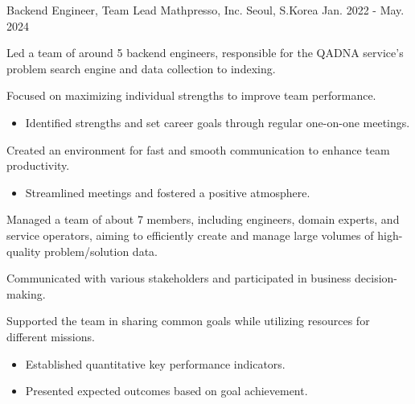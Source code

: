 \begin{cventries}
\cventry
  {Backend Engineer, Team Lead} %
  {Mathpresso, Inc.} %
  {Seoul, S.Korea} %
  {Jan. 2022 - May. 2024} %
  {
    \begin{cvsubentries}
      \begin{cvitems}
        \item[] {Led a team of around 5 backend engineers, responsible for the QADNA service's problem search engine and data collection to indexing.}
        \item {Focused on maximizing individual strengths to improve team performance.}
        \begin{itemize}
          \item {Identified strengths and set career goals through regular one-on-one meetings.}
        \end{itemize}
        \item {Created an environment for fast and smooth communication to enhance team productivity.}
        \begin{itemize}
          \item {Streamlined meetings and fostered a positive atmosphere.}
        \end{itemize}
        \item[]
      \end{cvitems}
      \begin{cvitems}
        \item[] {Managed a team of about 7 members, including engineers, domain experts, and service operators, aiming to efficiently create and manage large volumes of high-quality problem/solution data.}
        \item {Communicated with various stakeholders and participated in business decision-making.}
        \item {Supported the team in sharing common goals while utilizing resources for different missions.}
        \begin{itemize}
          \item {Established quantitative key performance indicators.}
          \item {Presented expected outcomes based on goal achievement.}
        \end{itemize}
        \item[] 
      \end{cvitems}
    \end{cvsubentries}
  }


\end{cventries}
